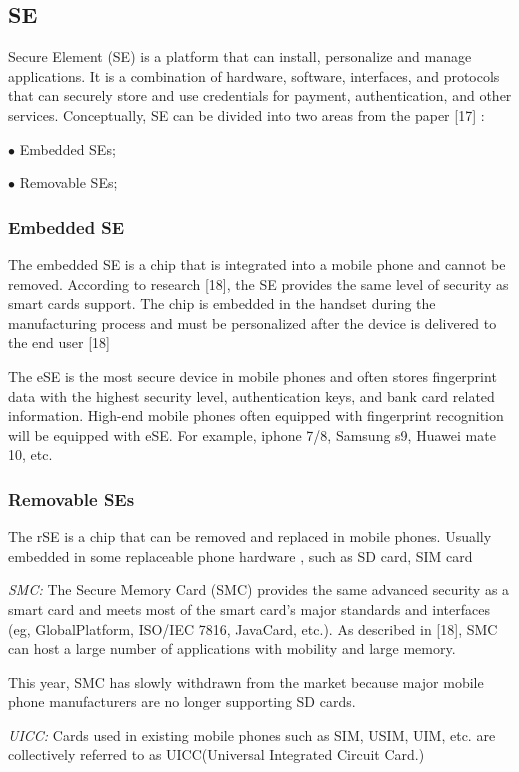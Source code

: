 \documentclass[journal]{IEEEtran}
\begin{document}
\subsection{SE}
Secure Element (SE) is a platform that can install, personalize and manage applications. It is a combination of hardware, software, interfaces, and protocols that can securely store and use credentials for payment, authentication, and other services. Conceptually, SE can be divided into two areas from the paper [17] :

$\bullet$ Embedded SEs;

$\bullet$ Removable SEs;


\subsubsection{Embedded SE}
The embedded SE is a chip that is integrated into a mobile phone and cannot be removed. According to research [18], the SE provides the same level of security as smart cards support. The chip is embedded in the handset during the manufacturing process and must be personalized after the device is delivered to the end user [18]

The eSE is the most secure device in mobile phones and often stores fingerprint data with the highest security level, authentication keys, and bank card related information. High-end mobile phones often equipped with fingerprint recognition will be equipped with eSE. For example, iphone 7/8, Samsung s9, Huawei mate 10, etc.

\subsubsection{Removable SEs} The rSE is a chip that can be removed and replaced in mobile phones. Usually embedded in some replaceable phone hardware
, such as SD card, SIM card

\emph {SMC:} The Secure Memory Card (SMC) provides the same advanced security as a smart card and meets most of the smart card's major standards and interfaces (eg, GlobalPlatform, ISO/IEC 7816, JavaCard, etc.). As described in [18], SMC can host a large number of applications with mobility and large memory. 

This year, SMC has slowly withdrawn from the market because major mobile phone manufacturers are no longer supporting SD cards.

\emph {UICC:}  Cards used in existing mobile phones such as SIM, USIM, UIM, etc. are collectively referred to as UICC(Universal Integrated Circuit Card.)
\end{document}
